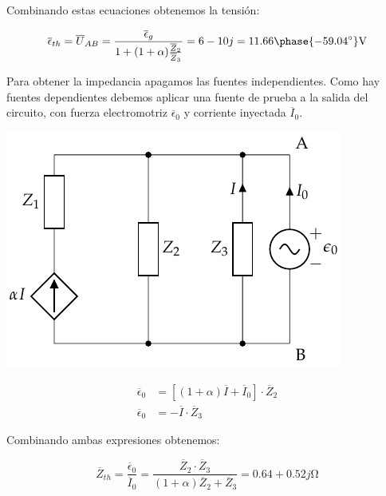 \documentclass[12pt]{article}
\begin{document}
Combinando estas ecuaciones obtenemos la tensión:

\begin{equation*}
  \overline{\epsilon}_{th} = \overline{U}_{AB} = \frac{\overline{\epsilon}_g}{1 + (1 + \alpha) \frac{\overline{Z}_2}{\overline{Z}_3}} = 6 - 10j = 11.66\phase{\ang{-59.04}}\si{\volt}
\end{equation*}

Para obtener la impedancia apagamos las fuentes independientes. Como hay fuentes dependientes debemos aplicar una fuente de prueba a la salida del circuito, con fuerza electromotriz $\overline{\epsilon}_0$ y corriente inyectada $\overline{I}_0$.

\begin{minipage}{0.5\linewidth}
  \begin{center}
    \includegraphics{../figs/Thevenin4_fuenteprueba}
  \end{center}
\end{minipage}
\begin{minipage}{0.5\linewidth}
  \begin{align*}
    \overline{\epsilon}_0 &= [(1 + \alpha) \overline{I} + \overline{I}_0] \cdot \overline{Z}_2\\
    \overline{\epsilon}_0 &= - \overline{I}\cdot \overline{Z}_3
  \end{align*}
\end{minipage}

Combinando ambas expresiones obtenemos:

\begin{equation*}
  \overline{Z}_{th} = \frac{\overline{\epsilon}_0}{\overline{I}_0} = \frac{\overline{Z}_2 \cdot \overline{Z}_3}{(1 + \alpha) \overline{Z}_2 + \overline{Z}_3} = 0.64 + 0.52j\si{\ohm}
\end{equation*}
\end{document}
